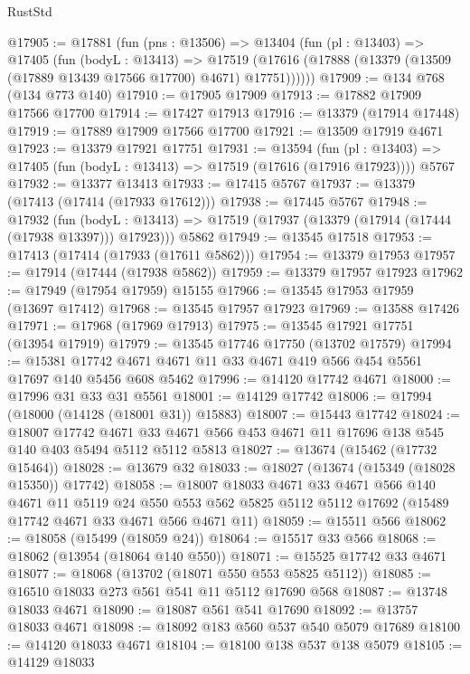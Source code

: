 \begin{lexlean}{RustStd}
\begin{coremodule}
@17905 := @17881
    (fun (pns : @13506) =>
    @13404
      (fun (pl : @13403) =>
      @17405
        (fun (bodyL : @13413) =>
        @17519 (@17616 (@17888 (@13379 (@13509 (@17889 @13439 @17566 @17700) @4671) @17751))))))
@17909 := @134 @768 (@134 @773 @140)
@17910 := @17905 @17909
@17913 := @17882 @17909 @17566 @17700
@17914 := @17427 @17913
@17916 := @13379 (@17914 @17448)
@17919 := @17889 @17909 @17566 @17700
@17921 := @13509 @17919 @4671
@17923 := @13379 @17921 @17751
@17931 := @13594
    (fun (pl : @13403) => @17405 (fun (bodyL : @13413) => @17519 (@17616 (@17916 @17923))))
    @5767
@17932 := @13377 @13413
@17933 := @17415 @5767
@17937 := @13379 (@17413 (@17414 (@17933 @17612)))
@17938 := @17445 @5767
@17948 := @17932
    (fun (bodyL : @13413) => @17519 (@17937 (@13379 (@17914 (@17444 (@17938 @13397))) @17923)))
    @5862
@17949 := @13545 @17518
@17953 := @17413 (@17414 (@17933 (@17611 @5862)))
@17954 := @13379 @17953
@17957 := @17914 (@17444 (@17938 @5862))
@17959 := @13379 @17957 @17923
@17962 := @17949 (@17954 @17959) @15155
@17966 := @13545 @17953 @17959 (@13697 @17412)
@17968 := @13545 @17957 @17923
@17969 := @13588 @17426
@17971 := @17968 (@17969 @17913)
@17975 := @13545 @17921 @17751 (@13954 @17919)
@17979 := @13545 @17746 @17750 (@13702 @17579)
@17994 := @15381 @17742 @4671 @4671 @11 @33 @4671 @419 @566 @454 @5561 @17697 @140 @5456 @608 @5462
@17996 := @14120 @17742 @4671
@18000 := @17996 @31 @33 @31 @5561
@18001 := @14129 @17742
@18006 := @17994 (@18000 (@14128 (@18001 @31)) @15883)
@18007 := @15443 @17742
@18024 := @18007
    @17742
    @4671
    @33
    @4671
    @566
    @453
    @4671
    @11
    @17696
    @138
    @545
    @140
    @403
    @5494
    @5112
    @5112
    @5813
@18027 := @13674 (@15462 (@17732 @15464))
@18028 := @13679 @32
@18033 := @18027 (@13674 (@15349 (@18028 @15350)) @17742)
@18058 := @18007
    @18033
    @4671
    @33
    @4671
    @566
    @140
    @4671
    @11
    @5119
    @24
    @550
    @553
    @562
    @5825
    @5112
    @5112
    @17692
    (@15489 @17742 @4671 @33 @4671 @566 @4671 @11)
@18059 := @15511 @566
@18062 := @18058 (@15499 (@18059 @24))
@18064 := @15517 @33 @566
@18068 := @18062 (@13954 (@18064 @140 @550))
@18071 := @15525 @17742 @33 @4671
@18077 := @18068 (@13702 (@18071 @550 @553 @5825 @5112))
@18085 := @16510 @18033 @273 @561 @541 @11 @5112 @17690 @568
@18087 := @13748 @18033 @4671
@18090 := @18087 @561 @541 @17690
@18092 := @13757 @18033 @4671
@18098 := @18092 @183 @560 @537 @540 @5079 @17689
@18100 := @14120 @18033 @4671
@18104 := @18100 @138 @537 @138 @5079
@18105 := @14129 @18033

\end{coremodule}
\end{lexlean}
